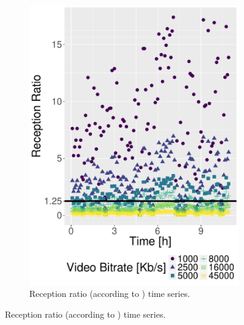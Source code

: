 \begin{figure}[!t]
\begin{subfigure}[b]{0.45\columnwidth}
        \includegraphics[width=\textwidth]{images/receptionratio-timeseries.pdf}
        \caption{Reception ratio (according to \cite{Hossfeld2013}) time series.}
        \label{fig:receptionratio}
    \end{subfigure}


\end{figure}
